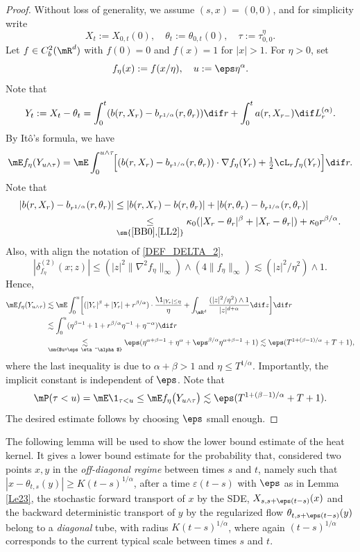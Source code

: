 \begin{proof}
Without loss of generality, we assume $(s,x)=(0,0)$, and for simplicity write
\[
X_t:=X_{0,t}(0),\quad \theta_t:=\theta_{0,t}(0),\quad \tau:=\tau^\eta_{0,0}.
\]
Let $f\in C^2_b(\mR^d)$ with $f(0)=0$ and $f(x)=1$ for $|x|>1$. For $\eta>0$, set
\[
f_\eta(x):=f(x/\eta),\quad u:=\eps\eta^\alpha.
\]
Note that
\[
Y_t:=X_t-\theta_t=\int^t_0(b(r,X_r)-b_{r^{1/\alpha}}(r,\theta_r))\dif r+\int^t_0a(r,X_{r-})\dif L^{(\alpha)}_r.
\]
By Itô's formula, we have
\begin{equation*}
\mE f_\eta(Y_{u\wedge\tau})=\mE\int^{u\wedge\tau}_0\!\!\Big[(b(r,X_r)-b_{r^{1/\alpha}}(r,\theta_r))\cdot\nabla f_\eta(Y_r)
+\tfrac12\cL_r f_\eta(Y_r)\Big]\dif r.
\end{equation*}
Note that
\begin{align*}
|b(r,X_r)-b_{r^{1/\alpha}}(r,\theta_r)|
&\leq|b(r,X_r)-b(r,\theta_r)|+|b(r,\theta_r)-b_{r^{1/\alpha}}(r,\theta_r)|
\\&\underset{\sm{\eqref{BB0},\eqref{LL2}}}{\leq}\kappa_0(|X_r-\theta_r|^\beta+|X_r-\theta_r|)+\kappa_0r^{\beta/\alpha}.
\end{align*}
Also, with align the notation of \eqref{DEF_DELTA_2},
\[
|\delta^{(2)}_{f_\eta}(x;z)|\leq (|z|^2\|\nabla^2 f_\eta\|_\infty)\wedge(4\|f_\eta\|_\infty)\lesssim (|z|^2/\eta^2)\wedge 1.
\]
Hence,
\begin{align*}
\mE f_\eta(Y_{u\wedge\tau})&\lesssim\mE\int^{u}_0\biggl[(|Y_r|^\beta+|Y_r|+r^{\beta/\alpha})\cdot\frac{\1_{|Y_r|\leq\eta}}{\eta}
+\int_{\mR^d}\frac{(|z|^2/\eta^2)\wedge 1}{|z|^{d+\alpha}}\dif z\biggr]\dif r
\\&\lesssim\int^{u}_0(\eta^{\beta-1}+1+r^{\beta/\alpha}\eta^{-1}+\eta^{-\alpha})\dif r
\\&\underset{\sm{$u=\eps\eta^\alpha$}}{\lesssim} \eps(\eta^{\alpha+\beta-1}+\eta^\alpha+ \eps^{\beta/\alpha}\eta^{\alpha+\beta-1}+1)
\lesssim \eps( T^{1+(\beta-1)/\alpha}+T+1),
\end{align*}
where the last inequality is due to $\alpha+\beta>1$ and $\eta\leq T^{1/\alpha}$. Importantly, the implicit constant is
independent of $\eps$. Note that
\begin{equation*}
\mP(\tau<u)=\mE\1_{\tau<u}\leq\mE f_{\eta}\bigl(Y_{u\wedge\tau}\bigr)\lesssim \eps(T^{1+(\beta-1)/\alpha}+T+1).
\end{equation*}
The desired estimate follows by choosing $\eps$ small enough.
\end{proof}
The following lemma will be used to show the lower bound estimate of the heat kernel.
It gives a lower bound estimate for the probability that, considered two points $x,y$ in the \textit{off-diagonal regime} between times $s$ and $t$, namely such that $ |x-\theta_{t,s}(y)|\ge K(t-s)^{1/\alpha}$, after a time $\varepsilon (t-s)$ with $\eps $ as in Lemma \ref{Le23}, the stochastic forward transport of $x$ by the SDE, \ie $X_{s,s+\eps(t-s)}(x) $ and the backward deterministic transport of $y$ by the regularized flow $\theta_{t,s+\eps(t-s)}(y) $ belong to a \textit{diagonal} tube, with radius $K(t-s)^{1/\alpha} $,
where again $(t-s)^{1/\alpha} $ corresponds to the current typical scale between times $s$ and $t$.

